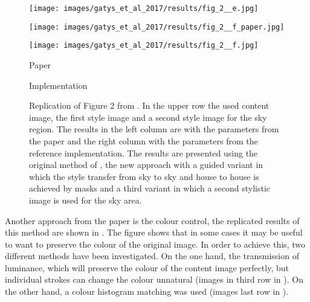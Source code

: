 \begin{figure}[H]
\begin{minipage}[t]{0.45\textwidth}
\end{minipage}
\hfill%
\begin{minipage}[t]{0.45\textwidth}
	\centering
	\texttt{[image: images/gatys\_et\_al\_2017/results/fig\_2\_\_e.jpg]}
\end{minipage}
\hfill%
\begin{minipage}[t]{0.45\textwidth}
	\centering
	\texttt{[image: images/gatys\_et\_al\_2017/results/fig\_2\_\_f\_paper.jpg]}
\end{minipage}
\hfill%
\begin{minipage}[t]{0.45\textwidth}
	\centering
	\texttt{[image: images/gatys\_et\_al\_2017/results/fig\_2\_\_f.jpg]}
\end{minipage}
	\hfill%
\begin{minipage}[t]{0.45\textwidth}
	\centering
	Paper
\end{minipage}
\hfill%
\begin{minipage}[t]{0.45\textwidth}
	\centering
	Implementation
\end{minipage}
\caption{Replication of Figure 2 from \cite{GEB+2017}. In the upper row the used content image, the first style image and a second style image for the sky region. The results in the left column are with the parameters from the paper and the right column with the parameters from the reference implementation.  The results are presented using the original method of \cite{GEB2016}, the new approach with a guided variant in which the style transfer from sky to sky and house to house is achieved by masks and a third variant in which a second stylistic image is used for the sky area.}
\label{fig:GEB+2017_fig2}
\end{figure}

Another approach from the paper is the colour control, the replicated results of this method are shown in . The figure shows that in some cases it may be useful to want to preserve the colour of the original image. In order to achieve this, two different methods have been investigated. On the one hand, the transmission of luminance, which will preserve the colour of the content image perfectly, but individual strokes can change the colour unnatural (images in third row in ). On the other hand, a colour histogram matching was used (images last row in ).

